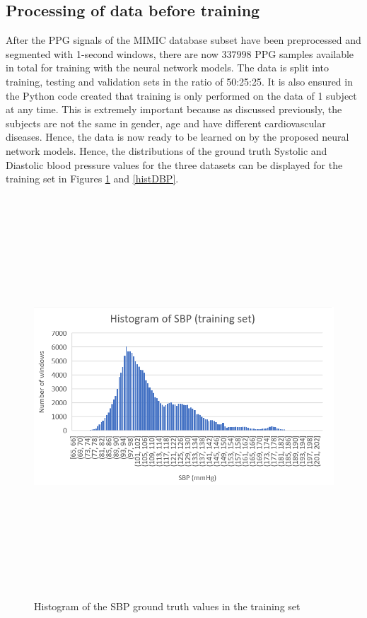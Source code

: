 \subsection{Processing of data before training}
After the PPG signals of the MIMIC database subset have been preprocessed and segmented with 1-second windows, there are now $337998$ PPG samples available in total for training with the neural network models. 
The data is split into training, testing and validation sets in the ratio of 50:25:25. It is also ensured in the Python code created that training is only performed on the data of 1 subject at any time. 
This is extremely important because as discussed previously, the subjects are not the same in gender, age and have different cardiovascular diseases. Hence, the data is now ready to be 
learned on by the proposed neural network models. Hence, the distributions of the ground truth Systolic and Diastolic blood pressure values for the three 
datasets can be displayed for the training set in Figures \ref{histSBP} and \ref{histDBP}.
\begin{figure}[H]
    \centering
    \includegraphics[width=15cm,height=15cm,keepaspectratio]{Implementation/trainingSbp.png}
    \caption{Histogram of the SBP ground truth values in the training set}
    \label{histSBP}
\end{figure}
